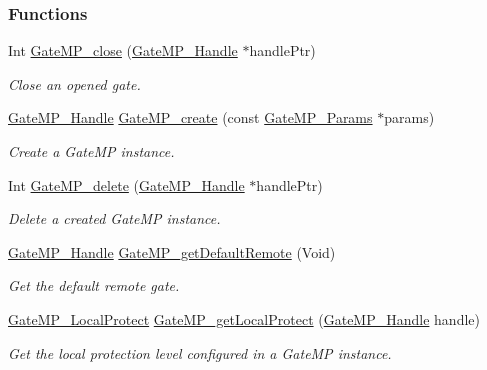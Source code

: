 \subsubsection*{Functions}
\begin{DoxyCompactItemize}
\item 
Int \hyperlink{_gate_m_p_8h_a0c64bfa32191b16de290787289e46481}{GateMP\_\-close} (\hyperlink{_gate_m_p_8h_ad5bb259f928a14e98d973334bc60ebb3}{GateMP\_\-Handle} $\ast$handlePtr)
\begin{DoxyCompactList}\small\item\em Close an opened gate. \item\end{DoxyCompactList}\item 
\hyperlink{_gate_m_p_8h_ad5bb259f928a14e98d973334bc60ebb3}{GateMP\_\-Handle} \hyperlink{_gate_m_p_8h_ad83d284487eb5d7996318c7e8d88cf82}{GateMP\_\-create} (const \hyperlink{struct_gate_m_p___params}{GateMP\_\-Params} $\ast$params)
\begin{DoxyCompactList}\small\item\em Create a GateMP instance. \item\end{DoxyCompactList}\item 
Int \hyperlink{_gate_m_p_8h_aed5bd2b4543a937c82aba23f9458983c}{GateMP\_\-delete} (\hyperlink{_gate_m_p_8h_ad5bb259f928a14e98d973334bc60ebb3}{GateMP\_\-Handle} $\ast$handlePtr)
\begin{DoxyCompactList}\small\item\em Delete a created GateMP instance. \item\end{DoxyCompactList}\item 
\hyperlink{_gate_m_p_8h_ad5bb259f928a14e98d973334bc60ebb3}{GateMP\_\-Handle} \hyperlink{_gate_m_p_8h_a6c09c820ed3852840f0ce3036a276687}{GateMP\_\-getDefaultRemote} (Void)
\begin{DoxyCompactList}\small\item\em Get the default remote gate. \item\end{DoxyCompactList}\item 
\hyperlink{_gate_m_p_8h_a3877bd64627d7449d3687e8b06939652}{GateMP\_\-LocalProtect} \hyperlink{_gate_m_p_8h_ace72dca8b36d6bcb16d931463cdcece1}{GateMP\_\-getLocalProtect} (\hyperlink{_gate_m_p_8h_ad5bb259f928a14e98d973334bc60ebb3}{GateMP\_\-Handle} handle)
\begin{DoxyCompactList}\small\item\em Get the local protection level configured in a GateMP instance. \item\end{DoxyCompactList}\item 

\end{DoxyCompactItemize}
